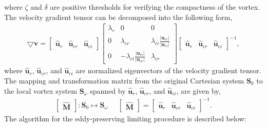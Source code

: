 where $\zeta$ and $\delta$ are positive thresholds for verifying the compactness of the vortex. The velocity gradient tensor can be decomposed into the following form,
\begin{align} 
\pmb\bigtriangledown\mathbf{v}=\begin{bmatrix}
\hat{\mathbf{u}}_{r} & \hat{\mathbf{u}}_{cr} & \hat{\mathbf{u}}_{ci} 
\end{bmatrix}
\begin{bmatrix}
 \lambda_{r}&0&0 \\ 
 0&\lambda_{cr}&\lambda_{ci}\frac{\left |\mathbf{u}_{cr}\right |}{\left |\mathbf{u}_{ci}\right |}\\ 
 0&-\lambda_{ci}\frac{\left |\mathbf{u}_{ci}\right |}{\left |\mathbf{u}_{cr}\right |}&\lambda_{cr} 
\end{bmatrix}
\begin{bmatrix}
\hat{\mathbf{u}}_{r} & \hat{\mathbf{u}}_{cr} & \hat{\mathbf{u}}_{ci} 
\end{bmatrix}^{-1},
\end{align}
where $\hat{\mathbf{u}}_{r}$, $\hat{\mathbf{u}}_{cr}$, and $\hat{\mathbf{u}}_{ci}$ are normalized eigenvectors of the velocity gradient tensor.
The mapping and transformation matrix from the original Cartesian system $\mathbf{S}_{0}$ to the local vortex system $\mathbf{S}_{\omega}$ spanned by $\hat{\mathbf{u}}_{r}$, $\hat{\mathbf{u}}_{cr}$, and $\hat{\mathbf{u}}_{ci}$, are given by,
\begin{align} 
\begin{bmatrix}
\hat{\mathbf{M}}
\end{bmatrix}:\mathbf{S}_{0} \mapsto \mathbf{S}_{\omega}\; \; \; \; \; \begin{bmatrix}
\hat{\mathbf{M}}
\end{bmatrix}=\begin{bmatrix}
\hat{\mathbf{u}}_{r} & \hat{\mathbf{u}}_{cr} & \hat{\mathbf{u}}_{ci} 
\end{bmatrix}^{-1}.
\end{align}
The algorithm for the eddy-preserving limiting procedure is described below:
\renewcommand{\labelenumi}{\arabic{enumi}.}
